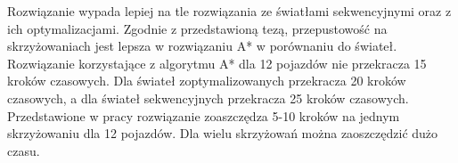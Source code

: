 Rozwiązanie wypada lepiej na tle rozwiązania ze światłami sekwencyjnymi oraz z ich optymalizacjami.
\newline
\newline
Zgodnie z przedstawioną tezą, przepustowość na skrzyżowaniach jest lepsza w rozwiązaniu A* w porównaniu do świateł.
\newline
\newline
Rozwiązanie korzystające z algorytmu A* dla 12 pojazdów nie przekracza 15 kroków czasowych. Dla świateł zoptymalizowanych przekracza 20 kroków czasowych, a dla świateł sekwencyjnych przekracza 25 kroków czasowych.
\newline
\newline
Przedstawione w pracy rozwiązanie zoaszczędza 5-10 kroków na jednym skrzyżowaniu dla 12 pojazdów. Dla wielu skrzyżowań można zaoszczędzić dużo czasu.
